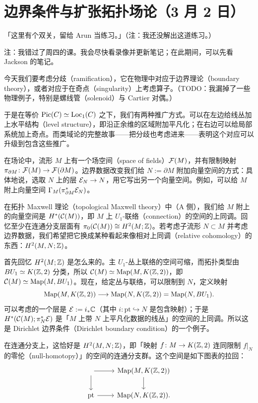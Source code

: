 \section[边界条件与扩张 TFT]{边界条件与扩张拓扑场论（3 月 2 日）}


「这里有个双关，留给 Arun 当练习。」（注：我还没解出这道练习。）

注：我错过了周四的课。我会尽快看录像并更新笔记；在此期间，可以先看 Jackson 的笔记。

今天我们要考虑分歧（ramification），它在物理中对应于边界理论（boundary theory），或者对应于在奇点（singularity）上考虑算子。（TODO：我漏掉了一些物理例子，特别是螺线管（solenoid）与 Cartier 对偶。）

于是在等价 $\operatorname{Pic}(C)\simeq \mathrm{Loc}_1(C)$ 之下，我们有两种推广方式。可以在左边给线丛加上水平结构（level structure），即沿正余维的区域附加平凡化；在右边可以给局部系统加上奇点。而类域论的完整故事——把分歧也考虑进来——表明这个对应可以升级到包含这些推广。

在场论中，流形 $M$ 上有一个场空间（space of fields）$\mathcal{F}(M)$，并有限制映射 $\pi_{\partial M}\colon\mathcal{F}(M)\to\mathcal{F}(\partial M)$。边界数据改变我们给 $N:=\partial M$ 附加向量空间的方式：具体地说，选取 $N$ 上的层 $\mathcal{E}_N\to N$，用它写出另一个向量空间。例如，可以给 $M$ 附上向量空间 $\Gamma_M(\pi_{\partial M}^*\mathcal{E}_N)$。

\begin{example}
  在拓扑 Maxwell 理论（topological Maxwell theory）中（A 侧），我们给 $M$ 附上的向量空间是 $H^*(\mathcal{C}(M))$，即 $M$ 上 $U_1$-联络（connection）的空间的上同调。回忆至少在连通分支层面有 $\pi_0(\mathcal{C}(M))\cong H^2(M;\mathbb{Z})$。若考虑子流形 $N\subset M$ 并考虑边界数据，我们希望把它换成某种看起来像相对上同调（relative cohomology）的东西：$H^2(M,N;\mathbb{Z})$。
\end{example}


首先回忆 $H^2(M;\mathbb{Z})$ 是怎么来的。主 $U_1$-丛上联络的空间可缩，而拓扑类型由 $BU_1\simeq K(\mathbb{Z},2)$ 分类，所以 $\mathcal{C}(M)\simeq \mathrm{Map}(M,K(\mathbb{Z},2))$，即 $\mathcal{C}(M)\simeq\mathrm{Map}(M,BU_1)$。现在，给定丛与联络，可以限制到 $N$，定义映射
\[
  \mathrm{Map}(M,K(\mathbb{Z},2)) \longrightarrow \mathrm{Map}(N,K(\mathbb{Z},2)) = \mathrm{Map}(N,BU_1).
\]
可以考虑的一个层是 $\mathcal{E}:=i_*\mathbb{C}$（其中 $i\colon \mathrm{pt}\hookrightarrow N$ 是包含映射）；于是 $H^*(\mathcal{C}(M);\pi_N^*\mathcal{E})$ 是「$M$ 上带 $N$ 上平凡化数据的线丛」的空间的上同调。所以这是 Dirichlet 边界条件（Dirichlet boundary condition）的一个例子。

在连通分支上，这恰好是 $H^2(M,N;\mathbb{Z})$，即「映射 $f\colon M\to K(\mathbb{Z},2)$ 连同限制 $f|_N$ 的零伦（null-homotopy）」的空间的连通分支群。这个空间是如下图表的拉回：
\[
  \begin{tikzcd}
    \arrow[r] \arrow[d] & \mathrm{Map}(M,K(\Z,2)) \arrow[d] \\
    \mathrm{pt} \arrow[r] & \mathrm{Map}(N,K(\Z,2)).
  \end{tikzcd}
\]

